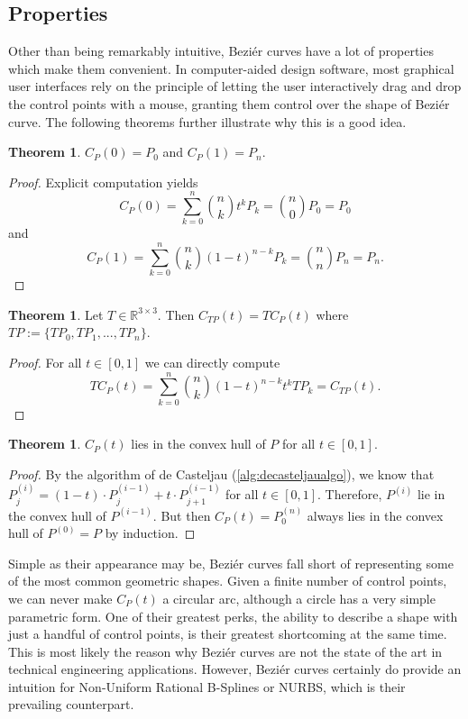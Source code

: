 \documentclass[a4paper, 11pt]{report}
\theoremstyle{definition}
\newtheorem{theorem}[definition]{Theorem}
\begin{document}
\subsection{Properties}
Other than being remarkably intuitive, Beziér curves have a lot of properties which make them convenient. In computer-aided design software, most graphical user interfaces rely on the principle of letting the user interactively drag and drop the control points with a mouse, granting them control over the shape of Beziér curve. The following theorems further illustrate why this is a good idea.

\begin{theorem}
	$C_P(0) = P_0$ and $C_P(1) = P_n$.
\end{theorem}
\begin{proof}
	Explicit computation yields
		$$C_P(0) = \sum_{k=0}^n \binom{n}{k} t^k P_k = \binom{n}{0} P_0 = P_0$$
	and
		$$C_P(1) = \sum_{k=0}^n \binom{n}{k} (1-t)^{n-k} P_k = \binom{n}{n} P_n = P_n.$$
\end{proof}

\begin{theorem}
	Let $T \in \mathbb{R}^{3 \times 3}$. Then $C_{TP}(t) = TC_P(t)$ where $TP := \{TP_0, TP_1, ..., TP_n\}$.
\end{theorem}
\begin{proof}
	For all $t \in [0, 1]$ we can directly compute
		$$TC_P(t) = \sum_{k=0}^n \binom{n}{k} (1-t)^{n-k}t^k TP_k = C_{TP}(t).$$
\end{proof}

\begin{theorem}
	$C_P(t)$ lies in the convex hull of $P$ for all $t \in [0,1]$.
\end{theorem}
\begin{proof}
	By the algorithm of de Casteljau (\ref{alg:decasteljaualgo}), we know that $P^{(i)}_j = (1-t) \cdot P^{(i-1)}_j + t \cdot P^{(i-1)}_{j+1}$ for all $t \in [0, 1]$. Therefore, $P^{(i)}$ lie in the convex hull of $P^{(i-1)}$. But then $C_P(t) = P^{(n)}_0$ always lies in the convex hull of $P^{(0)} = P$ by induction.
\end{proof}

Simple as their appearance may be, Beziér curves fall short of representing some of the most common geometric shapes. Given a finite number of control points, we can never make $C_P(t)$ a circular arc, although a circle has a very simple parametric form. One of their greatest perks, the ability to describe a shape with just a handful of control points, is their greatest shortcoming at the same time. This is most likely the reason why Beziér curves are not the state of the art in technical engineering applications. However, Beziér curves certainly do provide an intuition for Non-Uniform Rational B-Splines or NURBS, which is their prevailing counterpart.
\end{document}
